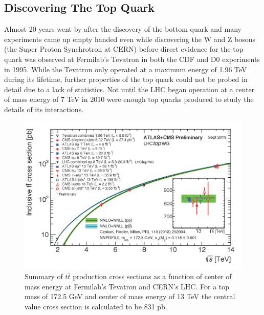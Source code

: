 \subsection{Discovering The Top Quark}

Almost 20 years went by after the discovery of the bottom quark and many experiments came up empty handed even while discovering the W and Z bosons (the Super Proton Synchrotron at CERN) before direct evidence for the top quark was observed at Fermilab's Tevatron in both the CDF and D0 experiments in 1995\cite{TopObs,TopObsD0}.  While the Tevatron only operated at a maximum energy of 1.96 TeV during its lifetime, further properties of the top quark could not be probed in detail due to a lack of statistics.  Not until the LHC began operation at a center of mass energy of 7 TeV in 2010 were enough top quarks produced to study the details of its interactions. 
\begin{figure}[h!]
	\centering
	\includegraphics[width=\columnwidth]{../ThesisImages/Theory/ttprodxsec.png}
	\caption[Summary of $t\bar{t}$ production cross sections as a function of center of mass energy at Fermilab's Tevatron and CERN's LHC.]{Summary of $t\bar{t}$ production cross sections as a function of center of mass energy at Fermilab's Tevatron and CERN's LHC.  For a top mass of 172.5 GeV and center of mass energy of 13 TeV the central value cross section is calculated to be 831 pb\cite{TopWG}. }
	\label{fig:ttbarXSec}
\end{figure}

